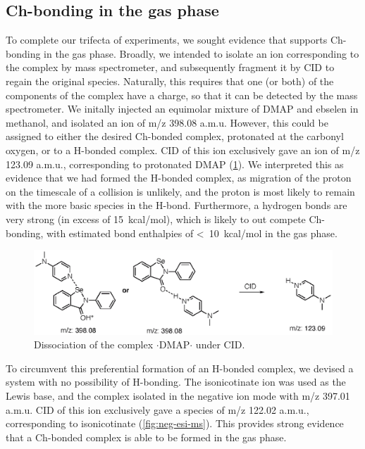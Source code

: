 \begin{refsection}
\subsection{Ch-bonding in the gas phase}
To complete our trifecta of experiments, we sought evidence that supports Ch-bonding in the gas phase.
Broadly, we intended to isolate an ion corresponding to the complex by mass spectrometer, and subsequently fragment it by CID to regain the original species.
Naturally, this requires that one (or both) of the components of the complex have a charge, so that it can be detected by the mass spectrometer.
We initally injected an equimolar mixture of DMAP and ebselen  in methanol, and isolated an ion of m/z 398.08 a.m.u.
However, this could be assigned to either the desired Ch-bonded complex, protonated at the carbonyl oxygen, or to a H-bonded complex.
CID of this ion exclusively gave an ion of m/z 123.09 a.m.u., corresponding to protonated DMAP (\ref{fig:pos-esi-ms}).
We interpreted this as evidence that we had formed the H-bonded complex, as migration of the proton on the timescale of a collision is unlikely, and the proton is most likely to remain with the more basic species in the H-bond.
Furthermore, a  hydrogen bonds are very strong (in excess of 15~kcal/mol)\autocite{Emsley1980}, which is likely to out compete Ch-bonding, with estimated bond enthalpies of <~10~kcal/mol in the gas phase.

\begin{figure}
    \centering
    \includegraphics[scale=0.8]{Figures/pos-esi-ms.eps}
    \caption[Positive mode ESI of $\cdot$DMAP$\cdot$]{Dissociation of the complex $\cdot$DMAP$\cdot$ under CID.}
    \label{fig:pos-esi-ms}
\end{figure}

To circumvent this preferential formation of an H-bonded complex, we devised a system with no possibility of H-bonding.
The isonicotinate ion was used as the Lewis base, and the complex isolated in the negative ion mode with m/z 397.01 a.m.u.
CID of this ion exclusively gave a species of m/z 122.02 a.m.u., corresponding to isonicotinate (\ref{fig:neg-esi-ms}).
This provides strong evidence that a Ch-bonded complex is able to be formed in the gas phase.


\end{refsection}
